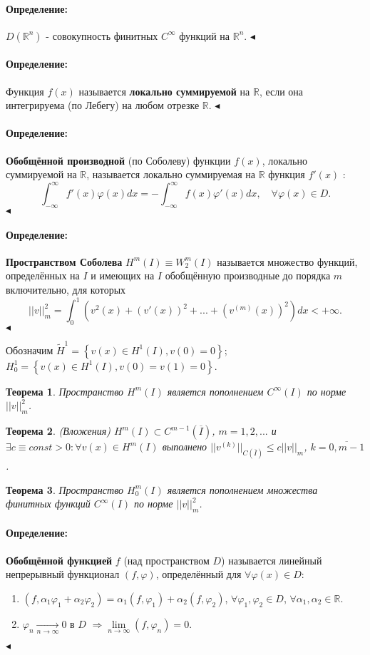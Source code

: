 \documentclass{article}
\newtheorem{theorem}{Теорема}
\newenvironment{definition}{ \paragraph{Определение:}}{\hfill $\blacktriangleleft$}
\begin{document}
\begin{definition}
	$D(\mathbb{R}^n)$ - совокупность финитных $C^{\infty}$ функций на $\mathbb{R}^n$.
\end{definition}

\begin{definition}
	Функция $f(x)$ называется \textbf{локально суммируемой} на $\mathbb{R}$, если она интегрируема (по Лебегу) на любом отрезке $\mathbb{R}$.
\end{definition}

\begin{definition}
	\textbf{Обобщённой производной} (по Соболеву)  функции $f(x)$, локально суммируемой на $\mathbb{R}$, называется локально суммируемая на $\mathbb{R}$ функция $f'(x)$ :
	\[
	\int_{-\infty}^{\infty} f'(x) \varphi(x) dx = - \int_{-\infty}^{\infty} f(x) \varphi'(x) dx, \quad \forall \varphi(x) \in D.
	\]
\end{definition}

\begin{definition}
	\textbf{Пространством Соболева} $H^m(I) \equiv W_2^m(I)$ называется множество функций, определённых на $I$ и имеющих на $I$ обобщённую производные до порядка $m$ включительно, для которых 
	\[
	||v||_m^2 = \int_0^1 \left( v^2(x) + (v'(x))^2 + ... + (v^{(m)}(x))^2 \right) dx < + \infty.	
	\]
\end{definition}

Обозначим 
$\tilde{H}^1 = \left\lbrace v(x) \in H^1(I), v(0) = 0 \right\rbrace$; 
$H_0^1 =  \left\lbrace v(x) \in H^1(I), v(0) = v(1) = 0 \right\rbrace$.

\begin{theorem}
	Пространство $H^m(I)$ является пополнением $C^{\infty}(I)$ по норме $||v||_m^2$.
\end{theorem}

\begin{theorem}
	(Вложения)
	$H^m(I) \subset C^{m-1}(\overline{I})$, $m = 1,2,...$ и $\exists c \equiv const > 0: \forall v(x) \in H^m(I)$ выполнено $||v^{(k)}||_{C(\overline{I})} \leqslant c ||v||_m$, $k = \overline{0,m-1}$. 
\end{theorem}

\begin{theorem}
	Пространство $H_0^m(I)$ является пополнением множества финитных функций $C^{\infty}(I)$ по норме $||v||_m^2$.
\end{theorem}

\begin{definition}
	\textbf{Обобщённой функцией} $f$ (над пространством $D$) называется линейный непрерывный функционал $(f,\varphi)$, определённый для $\forall \varphi(x) \in D$:
	\begin{enumerate}
	\item $(f, \alpha_1 \varphi_1 + \alpha_2 \varphi_2) = \alpha_1 (f,\varphi_1) + \alpha_2 (f,\varphi_2)$, $\forall \varphi_1, \varphi_2 \in D$, $\forall \alpha_1, \alpha_2 \in \mathbb{R}$.
	\item $\varphi_n \xrightarrow[n \rightarrow \infty]{} 0$ в $D$ $\Rightarrow \lim\limits_{n \to \infty} (f,\varphi_n) = 0$.
	\end{enumerate}
\end{definition}
\end{document}
